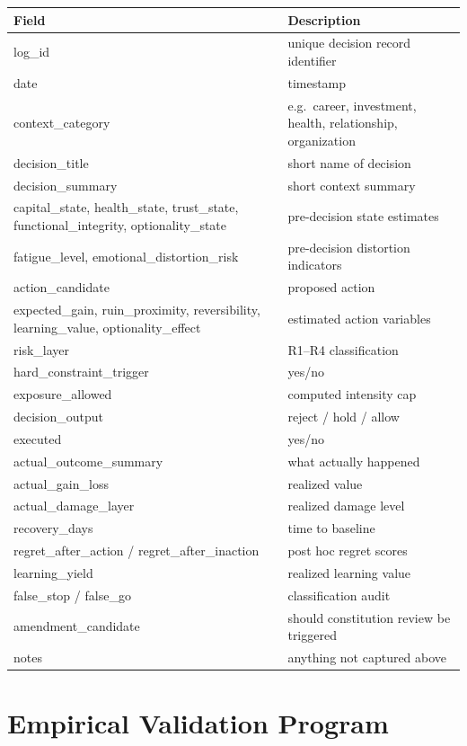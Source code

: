 \documentclass[11pt,a4paper]{article}
\theoremstyle{definition}\newtheorem{definition}{Definition}[section]
\begin{document}
\begin{longtable}{@{}lp{8cm}@{}}\toprule
Field&Description\\\midrule\endhead
log\_id&unique decision record identifier\\
date&timestamp\\
context\_category&e.g.\ career, investment, health, relationship, organization\\
decision\_title&short name of decision\\
decision\_summary&short context summary\\
capital\_state, health\_state, trust\_state, functional\_integrity, optionality\_state&pre-decision state estimates\\
fatigue\_level, emotional\_distortion\_risk&pre-decision distortion indicators\\
action\_candidate&proposed action\\
expected\_gain, ruin\_proximity, reversibility, learning\_value, optionality\_effect&estimated action variables\\
risk\_layer&R1--R4 classification\\
hard\_constraint\_trigger&yes/no\\
exposure\_allowed&computed intensity cap\\
decision\_output&reject / hold / allow\\
executed&yes/no\\
actual\_outcome\_summary&what actually happened\\
actual\_gain\_loss&realized value\\
actual\_damage\_layer&realized damage level\\
recovery\_days&time to baseline\\
regret\_after\_action / regret\_after\_inaction&post hoc regret scores\\
learning\_yield&realized learning value\\
false\_stop / false\_go&classification audit\\
amendment\_candidate&should constitution review be triggered\\
notes&anything not captured above\\
\bottomrule\end{longtable}


\section{Empirical Validation Program}
\end{document}
